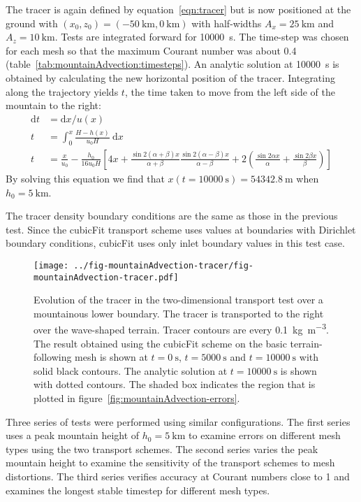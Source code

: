 The tracer is again defined by equation~\eqref{eqn:tracer} but is now positioned at the ground with $(x_0, z_0) = (\SI{-50}{\kilo\meter}, \SI{0}{\kilo\meter})$ with half-widths $A_x = \SI{25}{\kilo\meter}$ and $A_z = \SI{10}{\kilo\meter}$.
Tests are integrated forward for \SI{10000}{\second}.  The time-step was chosen for each mesh so that the maximum Courant number was about \num{0.4} (table~\ref{tab:mountainAdvection:timesteps}).
An analytic solution at \SI{10000}{\second} is obtained by calculating the new horizontal position of the tracer.  Integrating along the trajectory yields $t$, the time taken to move from the left side of the mountain to the right:
\begin{align}
	\mathrm{d}t &= \mathrm{d}x / u(x) \\
	t &= \int_0^x \frac{H - h(x)}{u_0 H}\:\mathrm{d}x \\
	t &= \frac{x}{u_0} - \frac{h_0}{16 u_0 H} \left[ 4x + \frac{\sin 2 (\alpha + \beta) x}{\alpha + \beta} 
 \frac{\sin 2(\alpha - \beta) x}{\alpha - \beta} + 2 \left( \frac{\sin 2\alpha x}{\alpha} + \frac{\sin 2\beta x}{\beta} \right) \right]
\end{align}
By solving this equation we find that \(x(t=\SI{10000}{\second}) = \SI{54342.8}{\meter}\) when $h_0 = \SI{5}{\kilo\meter}$.

The tracer density boundary conditions are the same as those in the previous test.
Since the cubicFit transport scheme uses values at boundaries with Dirichlet boundary conditions, cubicFit uses only inlet boundary values in this test case.

\begin{figure}
	\centering
	\texttt{[image: ../fig-mountainAdvection-tracer/fig-mountainAdvection-tracer.pdf]}
	\caption{Evolution of the tracer in the two-dimensional transport test over a mountainous lower boundary.  The tracer is transported to the right over the wave-shaped terrain.  Tracer contours are every \SI{0.1}{\kilo\gram\per\meter\cubed}.  The result obtained using the cubicFit scheme on the basic terrain-following mesh is shown at $t=\SI{0}{\second}$, $t=\SI{5000}{\second}$ and $t=\SI{10000}{\second}$ with solid black contours. The analytic solution at $t=\SI{10000}{\second}$ is shown with dotted contours.
	The shaded box indicates the region that is plotted in figure~\ref{fig:mountainAdvection-errors}.}
	\label{fig:mountainAdvection-tracer}
\end{figure}

Three series of tests were performed using similar configurations.  The first series uses a peak mountain height of $h_0 = \SI{5}{\kilo\meter}$ to examine errors on different mesh types using the two transport schemes.  The second series varies the peak mountain height to examine the sensitivity of the transport schemes to mesh distortions.  The third series verifies accuracy at Courant numbers close to 1 and examines the longest stable timestep for different mesh types.

